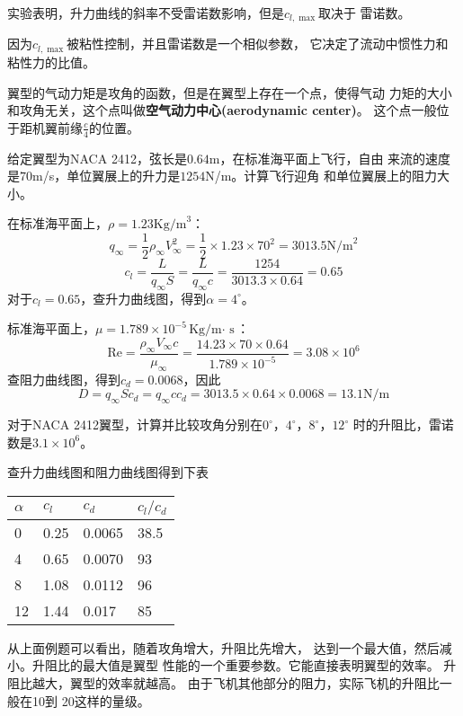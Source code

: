 实验表明，升力曲线的斜率不受雷诺数影响，但是$c_{l,\max}$取决于
雷诺数。
\begin{notice}
	因为$c_{l,\max}$被粘性控制，并且雷诺数是一个相似参数，
	它决定了流动中惯性力和粘性力的比值。
\end{notice}

翼型的气动力矩是攻角的函数，但是在翼型上存在一个点，使得气动
力矩的大小和攻角无关，这个点叫做{\bfseries 空气动力中心(aerodynamic center)}。
这个点一般位于距机翼前缘$\frac{c}{4}$的位置。
\begin{example}
	给定翼型为NACA 2412，弦长是$0.64$m，在标准海平面上飞行，自由
	来流的速度是$70$m/s，单位翼展上的升力是$1254$N/m。计算飞行迎角
	和单位翼展上的阻力大小。


	在标准海平面上，$\rho=1.23\text{Kg/m}^3$：
	\[
		q_\infty =\frac{1}{2}\rho_\infty V_\infty ^2 =\frac{1}{2}\times 1.23\times 70^2=3013.5
		\text{N/m}^2
	\]
	\[
		c_l=\frac{L}{q_\infty S}=\frac{L}{q_\infty c}=\frac{1254}{3013.3\times 0.64}=0.65
	\]
	对于$c_l=0.65$，查升力曲线图，得到$\alpha=4^\circ$。

	标准海平面上，$\mu=1.789\times 10^{-5}\text{Kg/m$\cdot$ s}$：
	\[
		\mathrm{Re}=\frac{\rho_\infty V_\infty c }{\mu_\infty}=\frac{14.23\times 70\times 0.64}{1.789\times 10^{-5}}
		=3.08\times 10^6
	\]
	查阻力曲线图，得到$c_d=0.0068$，因此
	\[
		D=q_\infty S c_d=q_\infty c c_d=3013.5\times 0.64\times 0.0068=13.1\text{N/m}
	\]
\end{example}
\begin{example}
	对于NACA 2412翼型，计算并比较攻角分别在$0^\circ$，$4^\circ$，$8^\circ$，$12^\circ$
	时的升阻比，雷诺数是$3.1\times 10^6$。

	查升力曲线图和阻力曲线图得到下表

	\centering
	\begin{tabular}{llll}
		\toprule
		$\alpha$ & $c_l$ & $c_d$  & $c_l /c_d$ \\
		\midrule
		0        & 0.25  & 0.0065 & 38.5       \\
		4        & 0.65  & 0.0070 & 93         \\
		8        & 1.08  & 0.0112 & 96         \\
		12       & 1.44  & 0.017  & 85         \\
		\bottomrule
	\end{tabular}
\end{example}

从上面例题可以看出，随着攻角增大，升阻比先增大，
达到一个最大值，然后减小。升阻比的最大值是翼型
性能的一个重要参数。它能直接表明翼型的效率。
{\color{noteorange}升阻比越大，翼型的效率就越高}。
由于飞机其他部分的阻力，实际飞机的升阻比一般在10到
20这样的量级。

